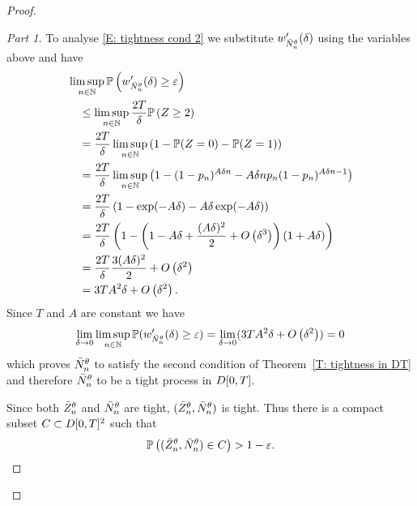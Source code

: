 \begin{proof}
\begin{proof}[Part 1]
To analyse \eqref{E: tightness cond 2} we substitute $w'_{\bar{N}_n^{\theta}}(\delta)$ using the variables above and have
\begin{equation*}
\begin{aligned}
&\limsup_{n \in \mathbb{N}}\mathbb{P}\left(w'_{\bar{N}_n^{\theta}}(\delta) \geq \varepsilon \right) \\
&\quad\leq \limsup_{n \in \mathbb{N}}\frac{2T}{\delta} \mathbb{P}\left( Z \geq 2 \right) \\
&\quad= \frac{2T}{\delta} \limsup_{n \in \mathbb{N}}\left(1 - \mathbb{P}( Z = 0 ) - \mathbb{P}( Z = 1 )\right) \\
&\quad= \frac{2T}{\delta} \limsup_{n \in \mathbb{N}}\left(1 - (1- p_n)^{A\delta n} - A\delta n p_n (1 - p_n)^{A\delta n - 1}\right) \\
&\quad= \frac{2T}{\delta} \left(1 - \exp(-A\delta) - A\delta\exp(-A\delta) \right) \\
&\quad= \frac{2T}{\delta}\left(  1 - \left(1- A\delta + \frac{(A\delta)^2}{2} + O\left(\delta^3\right)\right)(1 + A\delta ) \right) \\
&\quad= \frac{2T}{\delta} \frac{3(A\delta)^2}{2} + O\left(\delta^2\right) \\
&\quad= 3TA^2\delta + O\left(\delta^2\right).
\end{aligned}
\end{equation*}
Since $T$ and $A$ are constant we have
\begin{equation*}
	\lim_{\delta \rightarrow 0} \limsup_{n \in \mathbb{N}}\mathbb{P}(w'_{\bar{N}_n^{\theta}}(\delta) \geq \varepsilon ) 
	= \lim_{\delta \rightarrow 0} ( 3TA^2\delta + O\left(\delta^2\right) )
	= 0
\end{equation*}
which proves $\bar{N}_n^{\theta}$ to satisfy the second condition of Theorem~\ref{T: tightness in DT}
and therefore $\bar{N}_n^{\theta}$ to be a tight process in $D[0, T]$.

Since both $\bar{Z}^{\theta}_n$ and $\bar{N}_n^{\theta}$ are tight, $(\bar{Z}^{\theta}_n, \bar{N}_n^{\theta})$ is tight.
Thus there is a compact subset $C \subset D[0, T]^2$ such that
\begin{equation*}
	\mathbb{P}\left( (\bar{Z}^{\theta}_n, \bar{N}_n^{\theta}) \in C\right) > 1 - \varepsilon.
\end{equation*}
\end{proof}




\end{proof}
